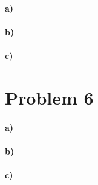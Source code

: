 \documentclass[12pt]{article}
\begin{document}
\paragraph{a)}

\paragraph{b)}

\paragraph{c)}

\section*{Problem 6}

\paragraph{a)}

\paragraph{b)}

\paragraph{c)}
\end{document}
